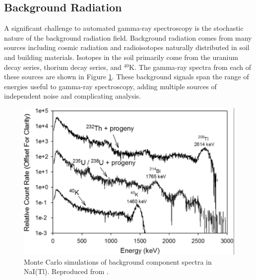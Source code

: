 \subsection{Background Radiation}


A significant challenge to automated gamma-ray spectroscopy is the stochastic nature of the background radiation field. Background radiation comes from many sources including cosmic radiation and radioisotopes naturally distributed in soil and building materials. Isotopes in the soil primarily come from the uranium decay series, thorium  decay series, and $^{40}$K. The gamma-ray spectra from each of these sources are shown in Figure \ref{fig:background_components}. These background signals span the range of energies useful to gamma-ray spectroscopy, adding multiple sources of independent noise and complicating analysis.

\begin{figure}[H]
\centering
\includegraphics[width=0.8\linewidth]{images/background_components}
\caption{Monte Carlo simulations of background component spectra in NaI(Tl). Reproduced from \cite{KULISEK2015}.}
\label{fig:background_components}
\end{figure}

